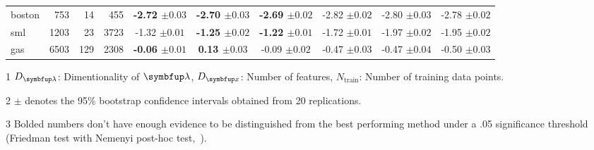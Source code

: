 \begin{table*}[b]
\begin{threeparttable}
\begin{tabular}{lrrrcccccc}
    \textsf{boston} & 753 & 14 & 455 & {\bf-2.72 {\scriptsize{\(\pm 0.03\)}}} & {\bf-2.70 {\scriptsize{\(\pm 0.03\)}}} & {\bf-2.69 {\scriptsize{\(\pm 0.02\)}}} & {-2.82 {\scriptsize{\(\pm 0.02\)}}} & {-2.80 {\scriptsize{\(\pm 0.03\)}}} & {-2.78 {\scriptsize{\(\pm 0.02\)}}}\\
    \textsf{sml} & 1203 & 23 & 3723 & {-1.32 {\scriptsize{\(\pm 0.01\)}}} & {\bf-1.25 {\scriptsize{\(\pm 0.02\)}}} & {\bf-1.22 {\scriptsize{\(\pm 0.01\)}}} & {-1.72 {\scriptsize{\(\pm 0.01\)}}} & {-1.97 {\scriptsize{\(\pm 0.02\)}}} & {-1.95 {\scriptsize{\(\pm 0.02\)}}} \\
    \textsf{gas} & 6503 & 129 & 2308 & {\bf-0.06 {\scriptsize{\(\pm 0.01\)}}} & {\bf 0.13 {\scriptsize{\(\pm 0.03\)}}} & {-0.09 {\scriptsize{\(\pm 0.02\)}}} & {-0.47 {\scriptsize{\(\pm 0.03\)}}} & {-0.47 {\scriptsize{\(\pm 0.04\)}}} & {-0.50 {\scriptsize{\(\pm 0.03\)}}}\\
    \bottomrule
 \end{tabular}
  \begin{tablenotes}
    \item[1] {\footnotesize \(D_{\vlambda}\): Dimentionality of \(\vlambda\), \(D_{\vx}\): Number of features, \(N_{\text{train}}\): Number of training data points.}
    \item[2] {\footnotesize \(\pm\) denotes the 95\% bootstrap confidence intervals obtained from 20 replications.}
    \item[3] {\footnotesize Bolded numbers don't have enough evidence to be distinguished from the best performing method under a .05 significance threshold (Friedman test with Nemenyi post-hoc test,~\citealt{JMLR:v7:demsar06a})}.
  \end{tablenotes}
  \end{threeparttable}
  \vspace{-2ex}
\end{table*}

